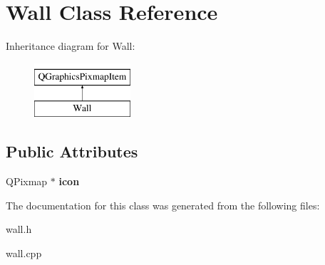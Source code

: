 \hypertarget{classWall}{\section{Wall Class Reference}
\label{classWall}
}
Inheritance diagram for Wall\-:\begin{figure}[H]
\begin{center}
\leavevmode
\includegraphics[height=2.000000cm]{classWall}
\end{center}
\end{figure}
\subsection*{Public Attributes}
\begin{DoxyCompactItemize}
\item 
\hypertarget{classWall_a815f7b9b4b8d1c3c8747978830572bc0}{Q\-Pixmap $\ast$ {\bfseries icon}}\label{classWall_a815f7b9b4b8d1c3c8747978830572bc0}

\end{DoxyCompactItemize}


The documentation for this class was generated from the following files\-:\begin{DoxyCompactItemize}
\item 
wall.\-h\item 
wall.\-cpp\end{DoxyCompactItemize}
